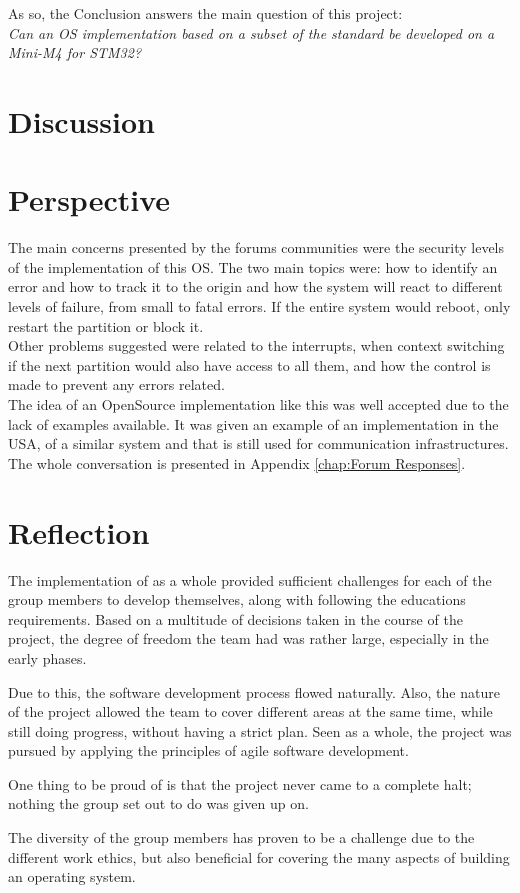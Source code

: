 As so, the Conclusion answers the main question of this project:\\
\textit{Can an OS implementation based on a subset of the \arinc{} standard be
developed on a Mini-M4 for STM32?}
\clearpage

\section{Discussion}

\section{Perspective}
The main concerns presented by the forums communities were the security levels of the implementation of
this OS. The two main topics were: how to identify an error and how to track it to the origin and how the
system will react to different levels of failure, from small to fatal errors. If the entire system would
reboot, only restart the partition or block it.\\
Other problems suggested were related to the interrupts, when context switching if the next partition
would also have access to all them, and how the control is made to prevent any errors related.\\
The idea of an OpenSource implementation like this was well accepted due to the lack of examples available.
It was given an example of an implementation in the USA, of a similar system and that is still used for
communication infrastructures.
The whole conversation is presented in Appendix \ref{chap:Forum Responses}.

\section{Reflection}
The implementation of \OSname{} as a whole provided sufficient challenges
for each of the group members to develop themselves, along with following
the education\textquotesingle s requirements.
Based on a multitude of decisions taken in the course of the project,
the degree of freedom the team had was rather large,
especially in the early phases.

Due to this, the software development process flowed naturally. 
Also, the nature of the project
allowed the team to cover different areas at the same time, while still
doing progress, without having a strict plan. Seen as a whole, the project
was pursued by applying the principles of agile software development.

One thing to be proud of is that the project never came to a complete halt;
nothing the group set out to do was given up on.

The diversity of the group members has proven to be a challenge due to the different work ethics,
but also beneficial for covering the many aspects of building an operating system.
